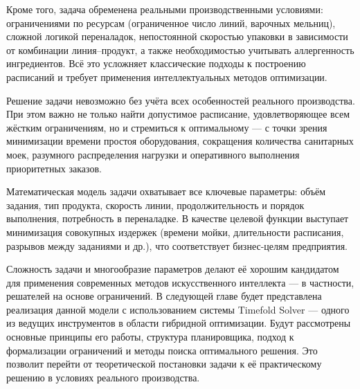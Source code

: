 Кроме того, задача обременена реальными производственными условиями: ограничениями по ресурсам (ограниченное число линий, варочных мельниц), сложной логикой переналадок, непостоянной скоростью упаковки в зависимости от комбинации линия–продукт, а также необходимостью учитывать аллергенность ингредиентов. Всё это усложняет классические подходы к построению расписаний и требует применения интеллектуальных методов оптимизации.

Решение задачи невозможно без учёта всех особенностей реального производства. При этом важно не только найти допустимое расписание, удовлетворяющее всем жёстким ограничениям, но и стремиться к оптимальному — с точки зрения минимизации времени простоя оборудования, сокращения количества санитарных моек, разумного распределения нагрузки и оперативного выполнения приоритетных заказов. 

Математическая модель задачи охватывает все ключевые параметры: объём задания, тип продукта, скорость линии, продолжительность и порядок выполнения, потребность в переналадке. В качестве целевой функции выступает минимизация совокупных издержек (времени мойки, длительности расписания, разрывов между заданиями и др.), что соответствует бизнес-целям предприятия.

Сложность задачи и многообразие параметров делают её хорошим кандидатом для применения современных методов искусственного интеллекта — в частности, решателей на основе ограничений. В следующей главе будет представлена реализация данной модели с использованием системы Timefold Solver — одного из ведущих инструментов в области гибридной оптимизации. Будут рассмотрены основные принципы его работы, структура планировщика, подход к формализации ограничений и методы поиска оптимального решения. Это позволит перейти от теоретической постановки задачи к её практическому решению в условиях реального производства.
